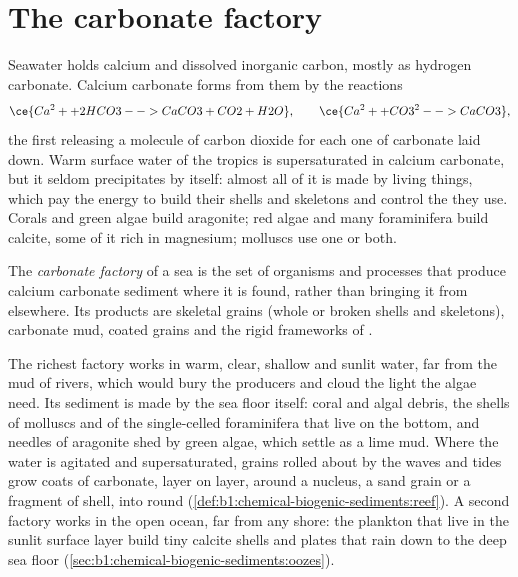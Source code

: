 \section{The carbonate factory}\label{sec:b1:chemical-biogenic-sediments:factory}

Seawater holds calcium and dissolved inorganic carbon, mostly as hydrogen
carbonate. Calcium carbonate forms from them by the reactions
\[
\ce{Ca^2+ + 2 HCO3- -> CaCO3 + CO2 + H2O}, \qquad
\ce{Ca^2+ + CO3^2- -> CaCO3},
\]
the first releasing a molecule of carbon dioxide for each one of carbonate
laid down. Warm surface water of the tropics is supersaturated in calcium
carbonate, but it seldom precipitates by itself: almost all of it is made by
living things, which pay the energy to build their shells and skeletons and
control the  they use. Corals and green algae build aragonite; red
algae and many foraminifera build calcite, some of it rich in magnesium;
molluscs use one or both.

\begin{definition}\label{def:b1:chemical-biogenic-sediments:factory}
The \emph{carbonate factory} of a sea is the set of
organisms and processes that produce calcium carbonate sediment where it is
found, rather than bringing it from elsewhere. Its products are skeletal grains
(whole or broken shells and skeletons), carbonate mud, coated grains and the
rigid frameworks of .
\end{definition}

The richest factory works in warm, clear, shallow and sunlit water, far from
the mud of rivers, which would bury the producers and cloud the light the
algae need. Its sediment is made by the sea floor itself: coral and algal
debris, the shells of molluscs and of the single-celled foraminifera that live
on the bottom, and needles of aragonite shed by green algae, which settle as a
lime mud. Where the water is agitated and supersaturated, grains rolled about by
the waves and tides grow coats of carbonate, layer on layer, around a nucleus,
a sand grain or a fragment of shell, into round 
(\cref{def:b1:chemical-biogenic-sediments:reef}). A second factory works in the
open ocean, far from any shore: the plankton that live in the sunlit surface
layer build tiny calcite shells and plates that rain down to the deep sea floor
(\cref{sec:b1:chemical-biogenic-sediments:oozes}).

